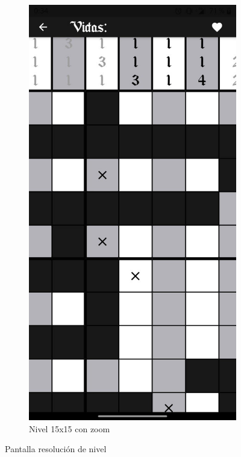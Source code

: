 \begin{figure}[H]
\begin{subfigure}[b]{0.45\linewidth}
    \end{subfigure}
    \begin{subfigure}[b]{0.45\linewidth}
      \includegraphics[width=\linewidth]{images/man7.jpeg}
      \caption{Nivel 15x15 con zoom}
      \label{fig:man1-7}
    \end{subfigure}
    \caption{Pantalla resolución de nivel}
    \label{fig:man4}
  \end{figure}

